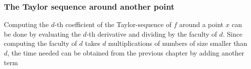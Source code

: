		\subsubsection{The Taylor sequence around another point}

			Computing the $d$-th coefficient of the Taylor-sequence of $f$ around a point $x$ can be done by evaluating the $d$-th derivative and dividing by the faculty of $d$.
			Since computing the faculty of $d$ takes $d$ multiplications of numbers of size smaller than $d$, the time needed can be obtained from the previous chapter by adding another term 

\newpage